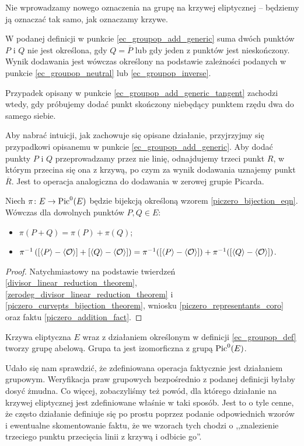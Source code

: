 \begin{remark}
Nie wprowadzamy nowego oznaczenia na grupę na krzywej eliptycznej --
będziemy ją oznaczać tak samo, jak oznaczamy krzywe.
\end{remark}

\begin{remark}
W podanej definicji w punkcie \ref{ec_groupop_add_generic}
suma dwóch punktów $P$ i $Q$
nie jest określona, gdy $Q = \overline{P}$
lub gdy jeden z punktów jest nieskończony.
Wynik dodawania jest wówczas określony
na podstawie zależności podanych w punkcie
\ref{ec_groupop_neutral} lub \ref{ec_groupop_inverse}.
\end{remark}

\begin{remark}
Przypadek opisany w punkcie \ref{ec_groupop_add_generic_tangent}
zachodzi wtedy,
gdy próbujemy dodać punkt skończony niebędący punktem rzędu dwa
do samego siebie.
\end{remark}

Aby nabrać intuicji, jak zachowuje się opisane działanie,
przyjrzyjmy się przypadkowi opisanemu w punkcie \ref{ec_groupop_add_generic}.
Aby dodać punkty $P$ i $Q$ przeprowadzamy przez nie linię,
odnajdujemy trzeci punkt $R$,
w którym przecina się ona z krzywą,
po czym za wynik dodawania uznajemy punkt $\overline{R}$.
Jest to operacja analogiczna do dodawania w zerowej grupie Picarda.

\begin{theorem}
Niech $\pi \colon E \to \operatorname{Pic}^0(E)$
będzie bijekcją określoną wzorem
\ref{piczero_bijection_eqn}.
Wówczas dla dowolnych punktów $P, Q \in E$:
\begin{itemize}
\item $\pi(P + Q) = \pi(P) + \pi(Q)$;
\item
$\pi^{-1}\left(
[\langle P\rangle - \langle\mathcal{O}\rangle]
+
[\langle Q\rangle - \langle\mathcal{O}\rangle]\right
)
=
\pi^{-1}([\langle P\rangle - \langle\mathcal{O}\rangle])
+
\pi^{-1}([\langle Q\rangle - \langle\mathcal{O}\rangle])$.
\end{itemize}
\end{theorem}

\begin{proof}
Natychmiastowy na podstawie
twierdzeń
\ref{divisor_linear_reduction_theorem},
\ref{zerodeg_divisor_linear_reduction_theorem}
i \ref{piczero_curvepts_bijection_theorem},
wniosku \ref{piczero_representants_coro}
oraz faktu \ref{piczero_addition_fact}.
\end{proof}

\begin{corollary}
Krzywa eliptyczna $E$ wraz z działaniem określonym w definicji
\ref{ec_groupop_def} tworzy grupę abelową.
Grupa ta jest izomorficzna z grupą $\operatorname{Pic}^0(E)$.
\end{corollary}

Udało się nam sprawdzić, że zdefiniowana operacja faktycznie
jest działaniem grupowym.
Weryfikacja praw grupowych bezpośrednio z podanej definicji
byłaby dosyć żmudna.
Co więcej, zobaczyliśmy też powód,
dla którego działanie na krzywej eliptycznej jest zdefiniowane
właśnie w taki sposób.
Jest to o tyle cenne, że często działanie
definiuje się po prostu poprzez podanie odpowiednich wzorów
i ewentualne skomentowanie faktu,
że we wzorach tych chodzi o ,,znalezienie trzeciego punktu
przecięcia linii z krzywą i odbicie go''.
